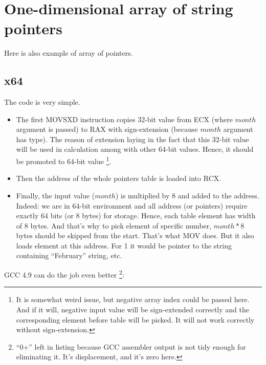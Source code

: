 ﻿%
\ifdefined\RUSSIAN
\else
\section{One-dimensional array of string pointers}

Here is also example of array of pointers.



\subsection{x64}

The code is very simple. 

\begin{itemize}

\item
The first MOVSXD instruction copies 32-bit value from ECX (where $month$ argument is passed) 
to RAX with sign-extension (because $month$ argument has \Tint type).
The reason of extension laying in the fact that this 32-bit value will be used in calculation among
with other 64-bit values. 
Hence, it should be promoted to 64-bit value
\footnote{It is somewhat weird issue, but negative array index could be passed here. 
And if it will, negative input \Tint value will be sign-extended correctly 
and the corresponding element before table will be picked. 
It will not work correctly without sign-extension.}.

\item
Then the address of the whole pointers table is loaded into RCX.

\item
Finally, the input value ($month$) is multiplied by 8 and added to the address.
Indeed: we are in 64-bit environment and all address (or pointers) require exactly 64 bits (or 8 bytes) 
for storage.
Hence, each table element has width of 8 bytes.
And that's why to pick element of specific number, $month*8$ bytes should be skipped from the start.
That's what MOV does.
But it also loads element at this address.
For 1 it would be pointer to the string containing ``February'' string, etc.

\end{itemize}



\Optimizing GCC 4.9 can do the job even better
\footnote{``0+'' left in listing because GCC assembler output is not tidy enough for eliminating it. 
It's displacement, and it's zero here.}:

